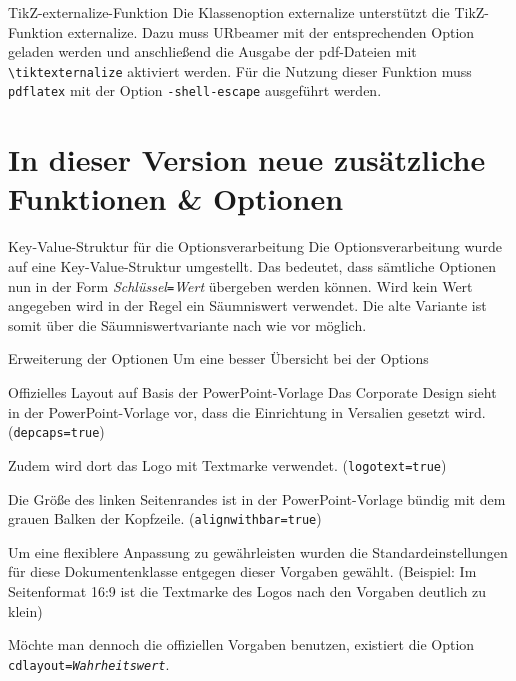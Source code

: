 \documentclass[english,%
	aspectratio=169,%
	colors={rz,faculties},%
	framenumber=true,%
	externalize=true,
	]{URbeamer}
\newcommand*\code[1]{\texttt{#1}}
\begin{document}
\begin{frame}{TikZ-externalize-Funktion}
	Die Klassenoption externalize unterstützt die TikZ-Funktion \glqq{}externalize\grqq. Dazu muss URbeamer mit der entsprechenden Option geladen werden und anschließend die Ausgabe der pdf-Dateien mit \code{\textbackslash{}tiktexternalize} aktiviert werden. Für die Nutzung dieser Funktion muss \code{pdflatex} mit  der Option \code{-shell-escape} ausgeführt werden.
\end{frame}

\part{In dieser Version neue zusätzliche Funktionen \& Optionen}

\begin{frame}{Key-Value-Struktur für die Optionsverarbeitung}
	Die Optionsverarbeitung wurde auf eine Key-Value-Struktur umgestellt. Das bedeutet, dass sämtliche Optionen nun in der Form \textit{Schlüssel}\code{=}\textit{Wert} übergeben werden können. Wird kein Wert angegeben wird in der Regel ein Säumniswert verwendet. Die alte Variante ist somit über die Säumniswertvariante nach wie vor möglich.
\end{frame}

\begin{frame}{Erweiterung der Optionen}
	Um eine besser Übersicht bei der Options
\end{frame}

\begin{frame}{Offizielles Layout auf Basis der PowerPoint-Vorlage}
\small
Das Corporate Design sieht in der PowerPoint-Vorlage vor, dass die Einrichtung in Versalien gesetzt wird.(\code{depcaps=true})

\smallskip
Zudem wird dort das Logo mit Textmarke verwendet. (\code{logotext=true})

\smallskip
Die Größe des linken Seitenrandes ist in der PowerPoint-Vorlage bündig mit dem grauen Balken der Kopfzeile. (\code{alignwithbar=true})

\medskip
Um eine flexiblere Anpassung zu gewährleisten wurden die Standardeinstellungen für diese Dokumentenklasse entgegen dieser Vorgaben gewählt.
(Beispiel: Im Seitenformat 16:9 ist die Textmarke des Logos nach den Vorgaben deutlich zu klein)

\smallskip
Möchte man dennoch die offiziellen Vorgaben benutzen, existiert die Option \code{cdlayout=\textit{Wahrheitswert}}.
\end{frame}
\end{document}
